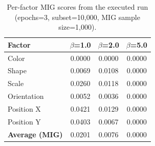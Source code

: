\begin{table}[H]
\centering
\begin{tabular}{@{}lccc@{}}
\toprule
\textbf{Factor} & \textbf{$\beta$=1.0} & \textbf{$\beta$=2.0} & \textbf{$\beta$=5.0} \\ \midrule
Color & 0.0000 & 0.0000 & 0.0000 \\
Shape & 0.0069 & 0.0108 & 0.0000 \\
Scale & 0.0260 & 0.0118 & 0.0000 \\
Orientation & 0.0052 & 0.0036 & 0.0000 \\
Position X & 0.0421 & 0.0129 & 0.0000 \\
Position Y & 0.0403 & 0.0067 & 0.0000 \\
\midrule
\textbf{Average (MIG)} & 0.0201 & 0.0076 & 0.0000 \\
\bottomrule
\end{tabular}
\caption{Per-factor MIG scores from the executed run (epochs=3, subset=10{,}000, MIG sample size=1{,}000).}
\label{tab:per_factor_mig}
\end{table}
